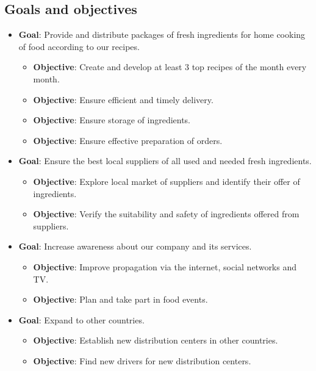\documentclass[11pt,a4paper]{article}
\begin{document}
\subsection{Goals and objectives}
\begin{itemize}
    \item \textbf{Goal}: Provide and distribute packages of fresh ingredients for home cooking of food according to our recipes.
    \begin{itemize}
        \item \textbf{Objective}: Create and develop at least 3 top recipes of the month every month.
        \item \textbf{Objective}: Ensure efficient and timely delivery.
        \item \textbf{Objective}: Ensure storage of ingredients.
        \item \textbf{Objective}: Ensure effective preparation of orders.
    \end{itemize}
    \item \textbf{Goal}: Ensure the best local suppliers of all used and needed fresh ingredients.
    \begin{itemize}
        \item \textbf{Objective}: Explore local market of suppliers and identify their offer of ingredients.
        \item \textbf{Objective}: Verify the suitability and safety of ingredients offered from suppliers.
    \end{itemize}
    \item \textbf{Goal}: Increase awareness about our company and its services.
    \begin{itemize}
        \item \textbf{Objective}: Improve propagation via the internet, social networks and TV.
        \item \textbf{Objective}: Plan and take part in food events.
    \end{itemize}
    \item \textbf{Goal}: Expand to other countries.
    \begin{itemize}
        \item \textbf{Objective}: Establish new distribution centers in other countries.
        \item \textbf{Objective}: Find new drivers for new distribution centers.
    \end{itemize}
\end{itemize}
\end{document}
